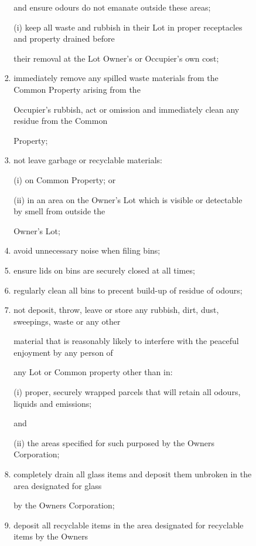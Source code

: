 \documentclass{article}
\begin{document}
\begin{enumerate}[label=\arabic*.]
\begin{enumerate}[label=\arabic{enumi}.\arabic*.]
\begin{enumerate}[label=(\arabic*)]
\begin{enumerate}[label=(\alph*)]
and ensure odours do not emanate outside these areas; 

(i) keep all waste and rubbish in their Lot in proper receptacles and property drained before 

their removal at the Lot Owner’s or Occupier’s own cost; 

\item  immediately remove any spilled waste materials from the Common Property arising from the 

Occupier’s rubbish, act or omission and immediately clean any residue from the Common 

Property; 

\item  not leave garbage or recyclable materials: 

(i) on Common Property; or 

(ii) in an area on the Owner’s Lot which is visible or detectable by smell from outside the 

Owner’s Lot; 

\item  avoid unnecessary noise when filing bins; 

\item  ensure lids on bins are securely closed at all times; 

\item  regularly clean all bins to precent build-up of residue of odours; 

\item  not deposit, throw, leave or store any rubbish, dirt, dust, sweepings, waste or any other 

material that is reasonably likely to interfere with the peaceful enjoyment by any person of 

any Lot or Common property other than in: 

(i) proper, securely wrapped parcels that will retain all odours, liquids and emissions; 

and 

\newpage

(ii) the areas specified for such purposed by the Owners Corporation; 

\item  completely drain all glass items and deposit them unbroken in the area designated for glass 

by the Owners Corporation;  

\item  deposit all recyclable items in the area designated for recyclable items by the Owners 


\end{enumerate}
\end{enumerate}
\end{enumerate}
\end{enumerate}
\end{document}
